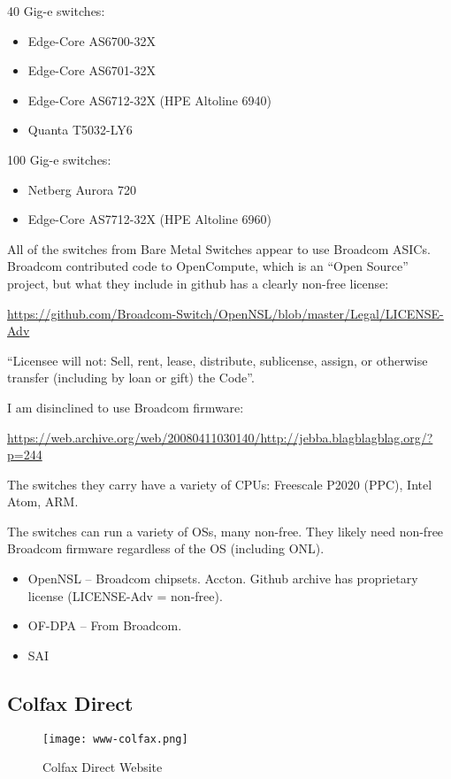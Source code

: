 40 Gig-e switches:
\begin{itemize}
 \item Edge-Core AS6700-32X
 \item Edge-Core AS6701-32X
 \item Edge-Core AS6712-32X (HPE Altoline 6940)
 \item Quanta T5032-LY6
\end{itemize}


100 Gig-e switches:
\begin{itemize}
 \item Netberg Aurora 720
 \item Edge-Core AS7712-32X (HPE Altoline 6960)
\end{itemize}


All of the switches from Bare Metal Switches appear to use Broadcom ASICs.
Broadcom contributed code to OpenCompute, which is an ``Open Source'' project,
but what they include in github has a clearly non-free license:


\url{https://github.com/Broadcom-Switch/OpenNSL/blob/master/Legal/LICENSE-Adv}


``Licensee will not:
Sell, rent, lease, distribute, sublicense, assign, or otherwise transfer
(including by loan or gift) the Code''.


I am disinclined to use Broadcom firmware:


\url{https://web.archive.org/web/20080411030140/http://jebba.blagblagblag.org/?p=244}


The switches they carry have a variety of CPUs:
Freescale P2020 (PPC), Intel Atom, ARM.


The switches can run a variety of OSs, many non-free. They likely need non-free
Broadcom firmware regardless of the OS (including ONL).


\begin{itemize}
 \item OpenNSL -- Broadcom chipsets. Accton. Github archive has proprietary
   license (LICENSE-Adv = non-free).
 \item OF-DPA -- From Broadcom.
 \item SAI 
\end{itemize}


\subsection{Colfax Direct}
\begin{figure}[h!]
\texttt{[image: www-colfax.png]}
 \caption{Colfax Direct Website}
 \label{fig:www-colfax}
\end{figure}



